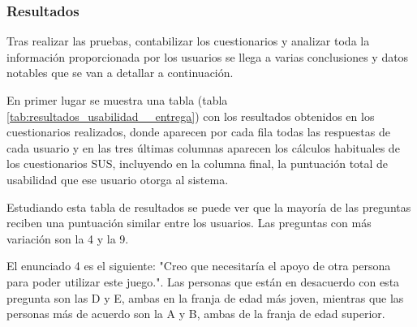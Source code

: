 \subsubsection{Resultados}
\label{sec:e5i2:res}

Tras realizar las pruebas, contabilizar los cuestionarios y analizar toda la información proporcionada por los usuarios se llega a varias conclusiones y datos notables que se van a detallar a continuación.

En primer lugar se muestra una tabla (tabla \ref{tab:resultados_usabilidad__entrega}) con los resultados obtenidos en los cuestionarios realizados, donde aparecen por cada fila todas las respuestas de cada usuario y en las tres últimas columnas aparecen los cálculos habituales de los cuestionarios SUS, incluyendo en la columna final, la puntuación total de usabilidad que ese usuario otorga al sistema.



\begin{table}[H]
	\centering
	\caption{Resultados de usabilidad obtenidos tras las pruebas}
	\label{tab:resultados_usabilidad__entrega}
\end{table}



Estudiando esta tabla de resultados se puede ver que la mayoría de las preguntas reciben una puntuación similar entre los usuarios. Las preguntas con más variación son la 4 y la 9.

El enunciado 4 es el siguiente: "Creo que necesitaría el apoyo de otra persona para poder utilizar este juego.". Las personas que están en desacuerdo con esta pregunta son las D y E, ambas en la franja de edad más joven, mientras que las personas más de acuerdo son la A y B, ambas de la franja de edad superior. 

